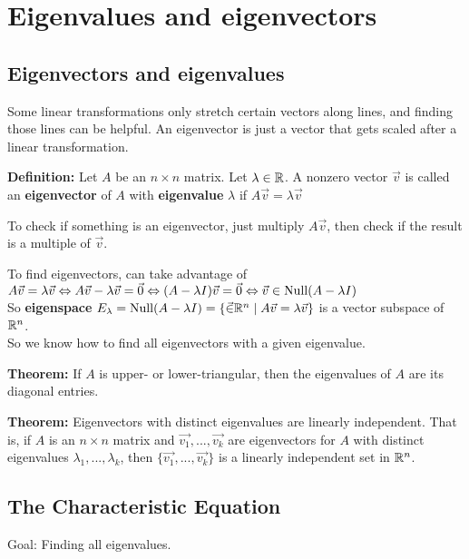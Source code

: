 \section{Eigenvalues and eigenvectors}

\subsection{Eigenvectors and eigenvalues}

Some linear transformations only stretch certain vectors along lines, and finding those lines can be helpful. An eigenvector is just a vector that gets scaled after a linear transformation.

\textbf{Definition:} Let $A$ be an $n \times n$ matrix. Let $\lambda \in \mathbb{R}$. A nonzero vector $\Vec{v}$ is called an \textbf{eigenvector} of $A$ with \textbf{eigenvalue} $\lambda$ if $A\Vec{v} = \lambda\Vec{v}$

To check if something is an eigenvector, just multiply $A\Vec{v}$, then check if the result is a multiple of $\Vec{v}$.

To find eigenvectors, can take advantage of\\
$A\Vec{v} = \lambda\Vec{v} \Leftrightarrow A\Vec{v} - \lambda\Vec{v} = \Vec{0} \Leftrightarrow (A - \lambda I)\Vec v = \Vec 0 \Leftrightarrow \Vec v \in \operatorname{Null}(A - \lambda I)$\\
So \textbf{eigenspace} $E_{\lambda} = \operatorname{Null}(A - \lambda I) = \{\Vec \in \mathbb{R}^n \mid A\Vec v = \lambda\Vec v\}$ is a vector subspace of $\mathbb{R}^n$.\\
So we know how to find all eigenvectors with a given eigenvalue.

\textbf{Theorem:} If $A$ is upper- or lower-triangular, then the eigenvalues of $A$ are its diagonal entries.

\textbf{Theorem:} Eigenvectors with distinct eigenvalues are linearly independent. That is, if $A$ is an $n \times n$ matrix and $\Vec{v_1}, ..., \Vec{v_k}$ are eigenvectors for $A$ with distinct eigenvalues $\lambda_1, ..., \lambda_k$, then $\{\Vec{v_1}, ..., \Vec{v_k}\}$ is a linearly independent set in $\mathbb{R}^n$.

\subsection{The Characteristic Equation}

Goal: Finding all eigenvalues.


